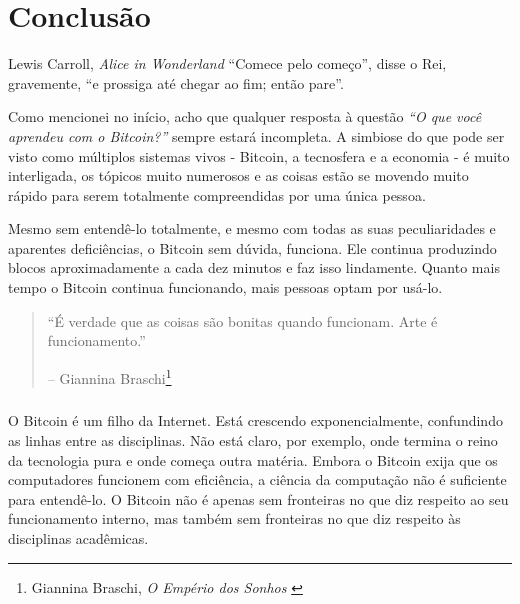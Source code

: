 \label{ch:conclusion}

\chapter*{Conclusão}

\begin{chapquote}{Lewis Carroll, \textit{Alice in Wonderland}}
\enquote{Comece pelo começo}, disse o Rei, gravemente, \enquote{e prossiga até chegar ao fim; então pare}.

\end{chapquote}

Como mencionei no início, acho que qualquer resposta à questão \textit{“O que você aprendeu com o Bitcoin?”} sempre estará incompleta. A simbiose do que pode ser visto como múltiplos sistemas vivos - Bitcoin, a tecnosfera e a economia - é muito interligada, os tópicos muito numerosos e as coisas estão se movendo muito rápido para serem totalmente compreendidas por uma única pessoa.

Mesmo sem entendê-lo totalmente, e mesmo com todas as suas peculiaridades e aparentes deficiências, o Bitcoin sem dúvida, funciona. Ele continua produzindo blocos aproximadamente a cada dez minutos e faz isso lindamente. Quanto mais tempo o Bitcoin continua funcionando, mais pessoas optam por usá-lo.

\begin{quotation}\begin{samepage}
\enquote{É verdade que as coisas são bonitas quando funcionam. Arte é funcionamento.}
\begin{flushright} -- Giannina Braschi\footnote{Giannina Braschi, \textit{O Empério dos Sonhos} \cite{braschi2011empire}}
\end{flushright}\end{samepage}\end{quotation}

\paragraph{}
O Bitcoin é um filho da Internet. Está crescendo exponencialmente, confundindo as linhas entre as disciplinas. Não está claro, por exemplo, onde termina o reino da tecnologia pura e onde começa outra matéria. Embora o Bitcoin exija que os computadores funcionem com eficiência, a ciência da computação não é suficiente para entendê-lo. O Bitcoin não é apenas sem fronteiras no que diz respeito ao seu funcionamento interno, mas também sem fronteiras no que diz respeito às disciplinas acadêmicas.

